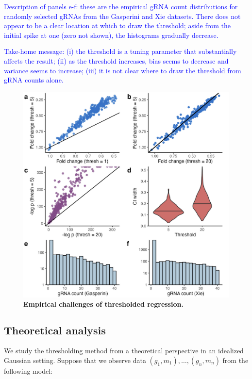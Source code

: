\documentclass[12pt]{article}
\newcommand{\blue}[1]{\textcolor{blue}{#1}}
\begin{document}
\blue{Description of panels e-f: these are the empirical gRNA count distributions for randomly selected gRNAs from the Gasperini and Xie datasets. There does not appear to be a clear location at which to draw the threshold; aside from the initial spike at one (zero not shown), the histograms gradually decrease.}

\blue{Take-home message: (i) the threshold is a tuning parameter that substantially affects the result; (ii) as the threshold increases, bias seems to decrease and variance seems to increase; (iii) it is not clear where to draw the threshold from gRNA counts alone.}

\begin{figure}[h!]
	\centering
	\includegraphics[width=1\linewidth]{../../figures/thresholding_empirical/plot}
	\caption{\textbf{Empirical challenges of thresholded regression.}}
	\label{thresholding_empirical}
\end{figure}
\newpage

\subsection{Theoretical analysis}

We study the thresholding method from a theoretical perspective in an idealized Gaussian setting. Suppose that we observe data $(g_1, m_1), \dots, (g_n, m_n)$ from the following model:
\end{document}
